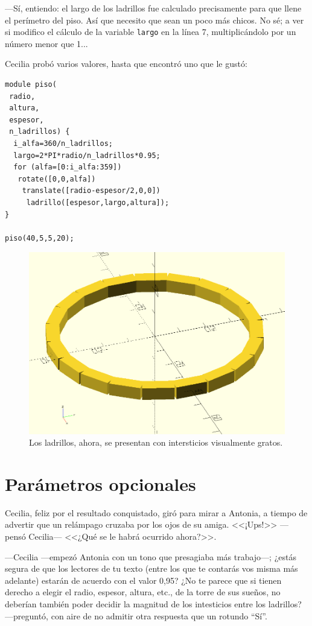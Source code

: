 ---Sí, entiendo: el largo de los ladrillos fue calculado precisamente
para que llene el perímetro del piso. Así que necesito que sean un
poco más chicos. No sé; a ver si modifico el cálculo de la variable
\texttt{largo} en la línea 7, multiplicándolo por un número menor que
1...

  Cecilia probó varios valores, hasta que encontró uno que le gustó:

    \begin{lstlisting}
module piso(
 radio,
 altura,
 espesor,
 n_ladrillos) {
  i_alfa=360/n_ladrillos;
  largo=2*PI*radio/n_ladrillos*0.95; 
  for (alfa=[0:i_alfa:359])
   rotate([0,0,alfa])
    translate([radio-espesor/2,0,0])
     ladrillo([espesor,largo,altura]); 
}

piso(40,5,5,20);
    \end{lstlisting}


    \begin{figure}[ht]
      \centering
      \includegraphics[width=.7\textwidth]{imagenes/piso-solucion-2}      
      \caption{Los ladrillos, ahora, se presentan con intersticios
        visualmente gratos.}
      \label{fig:piso-solucion-2}
    \end{figure}


  \section{Parámetros opcionales}

  Cecilia, feliz por el resultado conquistado, giró para mirar a
  Antonia, a tiempo de advertir que un relámpago cruzaba por los ojos
  de su amiga. <<¡Ups!>> ---pensó Cecilia--- <<¿Qué se le habrá
  ocurrido ahora?>>.

  ---Cecilia ---empezó Antonia con un tono que presagiaba más
  trabajo---; ¿estás segura de que los lectores de tu texto (entre los
  que te contarás vos misma más adelante) estarán de acuerdo con el
  valor 0,95? ¿No te parece que si tienen derecho a elegir el radio,
  espesor, altura, etc., de la torre de sus sueños, no deberían
  también poder decidir la magnitud de los intesticios entre los
  ladrillos? ---pre\-gun\-tó, con aire de no admitir otra respuesta
  que un rotundo ``Sí''.

